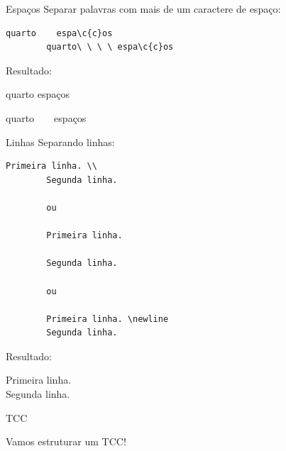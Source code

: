 \documentclass{beamer}
\begin{document}
\begin{frame}[fragile]{Espa\c{c}os}
    Separar palavras com mais de um caractere de espa\c{c}o:
    \begin{lstlisting}[style=limpo]
        quarto    espa\c{c}os
        quarto\ \ \ \ espa\c{c}os
    \end{lstlisting}

    Resultado:
    \begin{center}
        quarto    espa\c{c}os

        quarto\ \ \ \ espa\c{c}os
    \end{center}
\end{frame}

\begin{frame}[fragile]{Linhas}
    Separando linhas:
    \begin{lstlisting}[style=limpo]
        Primeira linha. \\
        Segunda linha.

        ou

        Primeira linha.

        Segunda linha.

        ou

        Primeira linha. \newline
        Segunda linha.
    \end{lstlisting}

    Resultado:
    \begin{center}
        Primeira linha. \\
        Segunda linha.
    \end{center}
\end{frame}

\begin{frame}{TCC}
    \begin{center}
        Vamos estruturar um TCC!
    \end{center}
\end{frame}
\end{document}
